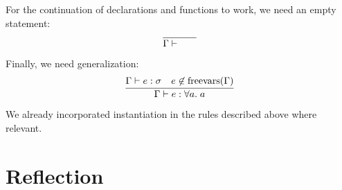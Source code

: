 For the continuation of declarations and functions to work, we need an empty statement:
\[
    \infer{\Gamma \vdash \qquad }{}
\]

Finally, we need generalization:
\[
    \infer{\Gamma \vdash e : \forall a.\; a}{
        \Gamma \vdash e : \sigma &
        e \not\in \operatorname{freevars}(\Gamma)
    }
\]

We already incorporated instantiation in the rules described above where relevant.

\section{Reflection}


